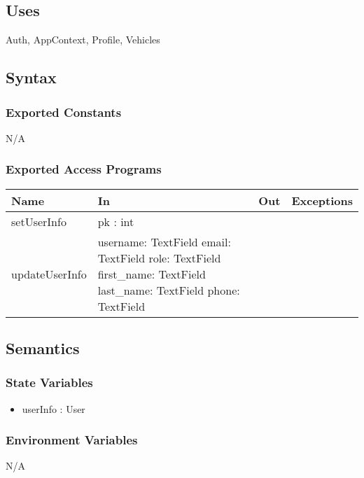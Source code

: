 \documentclass[12pt, titlepage]{article}
\begin{document}
    \subsection{Uses}
        Auth, AppContext, Profile, Vehicles
    \subsection{Syntax}
        \subsubsection{Exported Constants}
            N/A
        \subsubsection{Exported Access Programs}
            \begin{center}
                \begin{tabular}{p{2.5cm} p{4cm} p{4cm} p{3cm}}
                    \toprule
                    \textbf{Name} & \textbf{In} & \textbf{Out} & \textbf{Exceptions} \\
                    \midrule
                    setUserInfo & pk : int & & \\
                    updateUserInfo & username: TextField \newline email: TextField \newline role: TextField \newline first\_name: TextField \newline last\_name: TextField \newline phone: TextField & & \\
                    \bottomrule
                \end{tabular}
            \end{center}
    \subsection{Semantics}
        \subsubsection{State Variables}
            \begin{itemize}
                \item userInfo : User
            \end{itemize}
        \subsubsection{Environment Variables}
        N/A
\end{document}
